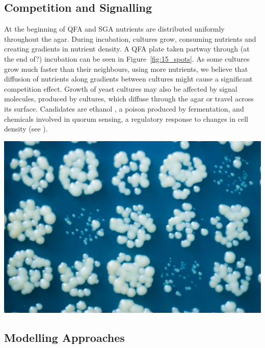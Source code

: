 \begin{multicols}{2}


\subsection{Competition and Signalling}

At the beginning of QFA and SGA nutrients are distributed uniformly throughout the
agar. During incubation, cultures grow, consuming nutrients and creating gradients in
nutrient density. A QFA plate taken partway through (at the end of?) incubation can be
seen in Figure~\ref{fig:15_spots}. As some cultures grow much faster than their
neighbours, using more nutrients, we believe that diffusion of nutrients along gradients
between cultures might cause a significant competition effect. Growth of yeast cultures
may also be affected by signal molecules, produced by cultures, which diffuse through the
agar or travel across its surface. Candidates are ethanol \citep{fujita2006}, a poison
produced by fermentation, and chemicals involved in quorum sensing, a regulatory response
to changes in cell density (see \citet{sprague2006,honigberg2011}).

\begin{Figure}
  \centering
  \includegraphics[width=\linewidth]{5658435523_c2e43729f1_b}
  \label{fig:15_spots}
\end{Figure}

\subsection{Modelling Approaches}


\end{multicols}
